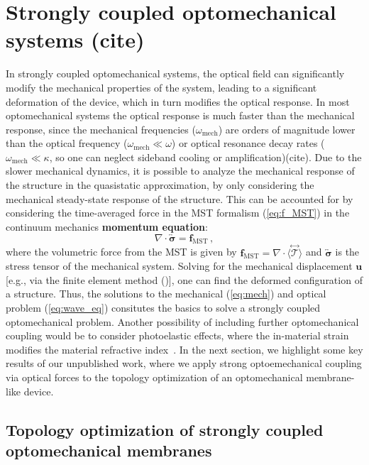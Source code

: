 \section{Strongly coupled optomechanical systems (cite)}\label{sec:mech_strongly_coupled}

In strongly coupled optomechanical systems, the optical field can significantly modify the mechanical properties of the system, leading to a significant deformation
of the device, which in turn modifies the optical response. In most optomechanical systems the optical response is much faster than the mechanical response, since the 
mechanical frequencies ($\omega_\text{mech}$) are orders of magnitude lower than the optical frequency ($\omega_\text{mech}\ll\omega$) or optical resonance decay rates ($\omega_\text{mech}\ll\kappa$, so one 
can neglect sideband cooling or amplification)\cite{opto_crys, photo_topopt}(cite). Due to the slower mechanical dynamics, it is possible to analyze the mechanical response of the structure in the quasistatic approximation, by only considering the mechanical steady-state response of the structure. 
This can be accounted for by considering the time-averaged force in the MST formalism (\eqref{eq:f_MST}) in the continuum mechanics \textbf{momentum equation}:
\begin{equation}\label{eq:mech}
    \nabla \cdot \overleftrightarrow{\boldsymbol{\sigma}} = \mathbf{f}_\text{MST}  \,,
\end{equation}
where the volumetric force from the MST is given by $ \mathbf{f}_\text{MST} = \nabla \cdot \langle \stackrel{\leftrightarrow}{\bm{\mathcal{T}}} \rangle$ and $\overleftrightarrow{\boldsymbol{\sigma}}$ is the stress tensor of the mechanical system. Solving for the mechanical
displacement $\mathbf{u}$ [e.g., via the finite element method ()], one can find the deformed configuration of a structure. Thus, the solutions to the mechanical (\eqref{eq:mech}) and optical problem
(\eqref{eq:wave_eq}) consitutes the basics to solve a strongly coupled optomechanical problem. Another possibility of including further optomechanical coupling would be to consider
photoelastic effects, where the in-material strain modifies the material refractive index~\cite{photoelasticity}.  In the next section, we highlight some key results of our unpublished work, where we apply strong optoemechanical coupling
via optical forces to the 
topology optimization of an optomechanical membrane-like device.

\subsection*{Topology optimization of strongly coupled optomechanical membranes~\cite{ownpub5}}

